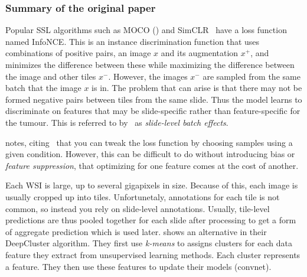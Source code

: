 \documentclass[10pt,twocolumn,letterpaper]{article}
\begin{document}




\subsubsection{Summary of the original paper}
Popular \gls{SSL} algorithms such as \gls{MOCO} () and SimCLR~\cite{simCLR} have a loss function named \gls{InfoNCE}. This is an instance discrimination function that uses combinations of positive pairs, an image $x$ and its augmentation $x^{+}$, and minimizes the difference between these while maximizing the difference between the image and other tiles $x^{-}$. However, the images $x^{-}$ are sampled from the same batch that the image $x$ is in. The problem that can arise is that there may not be formed negative pairs between tiles from the same slide. Thus the model learns to discriminate on features that may be slide-specific rather than feature-specific for the tumour. This is referred to by~\cite{sslUMAP} as \textit{slide-level batch effects}.

\cite{sslUMAP} notes, citing~\cite{contrastiveShortcut} that you can tweak the loss function by choosing samples using a given condition. However, this can be difficult to do without introducing bias or \textit{feature suppression}, that optimizing for one feature comes at the cost of another. 

Each \gls{WSI} is large, up to several gigapixels in size. Because of this, each image is usually cropped up into tiles. Unfortunetaly, annotations for each tile is not common, so instead you rely on slide-level annotations. Usually, tile-level predictions are thus pooled together for each slide after processing to get a form of aggregate prediction which is used later. \cite{unsupervisedClustering} shows an alternative in their DeepCluster algorithm. They first use \textit{k-means} to assigns clusters for each data feature they extract from unsupervised learning methods. Each cluster represents a feature. They then use these features to update their models (convnet). 
\end{document}
